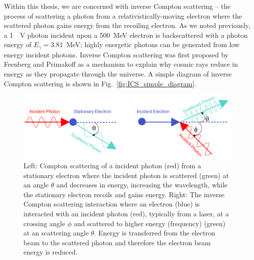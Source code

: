 \documentclass[../main.tex]{subfiles}
\begin{document}
Within this thesis, we are concerned with inverse Compton scattering -- the process of scattering a photon from a relativistically-moving electron where the scattered photon gains energy from the recoiling electron. As we noted previously, a 1~\si{\electron\volt} photon incident upon a 500~\si{\mega\electronvolt} electron is backscattered with a photon energy of $E_{\gamma} = 3.81$~\si{\mega\electronvolt}; highly energetic photons can be generated from low energy incident photons. Inverse Compton scattering was first proposed by Feenberg and Primakoff \cite{feenberg1948interaction} as a mechanism to explain why cosmic rays reduce in energy as they propagate through the universe. A simple diagram of inverse Compton scattering is shown in Fig.~\ref{fig:ICS_simple_diagram}.
\begin{figure}[!h]
\centering
\includegraphics[width=\textwidth]{Figures/Photon_Production_by_Inverse_Compton_Scattering/CS_ICS_diagram_simple_fixed.pdf}
\caption{Left: Compton scattering of a incident photon (red) from a stationary electron where the incident photon is scattered (green) at an angle $\theta$ and decreases in energy, increasing the wavelength, while the stationary electron recoils and gains energy. Right: The inverse Compton scattering interaction where an electron (blue) is interacted with an incident photon (red), typically from a laser, at a crossing angle $\phi$ and scattered to higher energy (frequency) (green) at an scattering angle $\theta$. Energy is transferred from the electron beam to the scattered photon and therefore the electron beam energy is reduced.}
\label{fig:CS_ICS_simple_diagram}
\end{figure}
\end{document}
